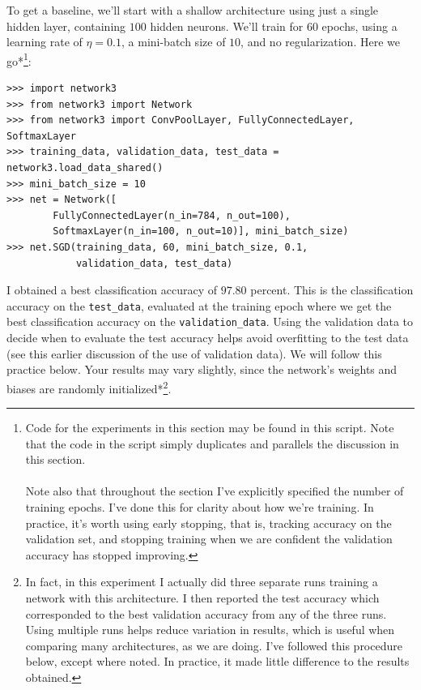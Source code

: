 To get a baseline, we'll start with a shallow architecture using just a single hidden layer, containing $100$ hidden neurons. We'll train for $60$ epochs, using a learning rate of $\eta = 0.1$, a mini-batch size of $10$, and no regularization. Here we go*\footnote{Code for the experiments in this section may be found in this script. Note that the code in the script simply duplicates and parallels the discussion in this section.\\ \\ Note also that throughout the section I've explicitly specified the number of training epochs. I've done this for clarity about how we're training. In practice, it's worth using early stopping, that is, tracking accuracy on the validation set, and stopping training when we are confident the validation accuracy has stopped improving.}:



\begin{lstlisting}
>>> import network3
>>> from network3 import Network
>>> from network3 import ConvPoolLayer, FullyConnectedLayer, SoftmaxLayer
>>> training_data, validation_data, test_data = network3.load_data_shared()
>>> mini_batch_size = 10
>>> net = Network([
        FullyConnectedLayer(n_in=784, n_out=100),
        SoftmaxLayer(n_in=100, n_out=10)], mini_batch_size)
>>> net.SGD(training_data, 60, mini_batch_size, 0.1, 
            validation_data, test_data)

\end{lstlisting}


I obtained a best classification accuracy of $97.80$ percent. This is the classification accuracy on the \texttt{test\_\allowbreak{}data}, evaluated at the training epoch where we get the best classification accuracy on the \texttt{validation\_\allowbreak{}data}. Using the validation data to decide when to evaluate the test accuracy helps avoid overfitting to the test data (see this earlier discussion of the use of validation data). We will follow this practice below. Your results may vary slightly, since the network's weights and biases are randomly initialized*\footnote{In fact, in this experiment I actually did three separate runs training a network with this architecture. I then reported the test accuracy which corresponded to the best validation accuracy from any of the three runs. Using multiple runs helps reduce variation in results, which is useful when comparing many architectures, as we are doing. I've followed this procedure below, except where noted. In practice, it made little difference to the results obtained.}.



